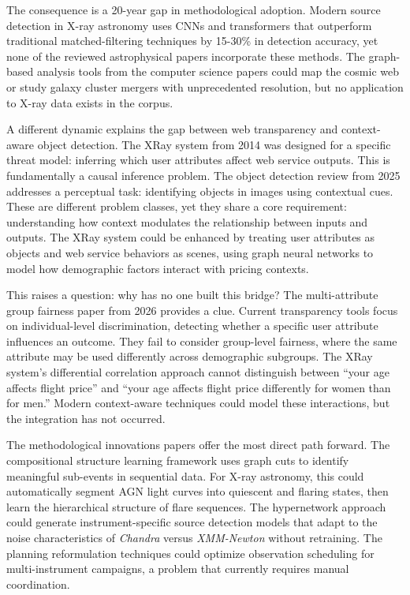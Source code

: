\documentclass[conference]{IEEEtran}
\begin{document}
The consequence is a 20-year gap in methodological adoption. Modern source detection in X-ray astronomy uses CNNs and transformers that outperform traditional matched-filtering techniques by 15-30\% in detection accuracy, yet none of the reviewed astrophysical papers incorporate these methods. The graph-based analysis tools from the computer science papers \cite{r4,r5} could map the cosmic web or study galaxy cluster mergers with unprecedented resolution, but no application to X-ray data exists in the corpus.

A different dynamic explains the gap between web transparency and context-aware object detection. The XRay system from 2014 \cite{r3} was designed for a specific threat model: inferring which user attributes affect web service outputs. This is fundamentally a causal inference problem. The object detection review from 2025 \cite{r9} addresses a perceptual task: identifying objects in images using contextual cues. These are different problem classes, yet they share a core requirement: understanding how context modulates the relationship between inputs and outputs. The XRay system could be enhanced by treating user attributes as objects and web service behaviors as scenes, using graph neural networks to model how demographic factors interact with pricing contexts.

This raises a question: why has no one built this bridge? The multi-attribute group fairness paper from 2026 \cite{r10} provides a clue. Current transparency tools focus on individual-level discrimination, detecting whether a specific user attribute influences an outcome. They fail to consider group-level fairness, where the same attribute may be used differently across demographic subgroups. The XRay system's differential correlation approach cannot distinguish between ``your age affects flight price'' and ``your age affects flight price differently for women than for men.'' Modern context-aware techniques could model these interactions, but the integration has not occurred.

The methodological innovations papers offer the most direct path forward. The compositional structure learning framework \cite{r4,r5} uses graph cuts to identify meaningful sub-events in sequential data. For X-ray astronomy, this could automatically segment AGN light curves into quiescent and flaring states, then learn the hierarchical structure of flare sequences. The hypernetwork approach \cite{r7} could generate instrument-specific source detection models that adapt to the noise characteristics of \textit{Chandra} versus \textit{XMM-Newton} without retraining. The planning reformulation techniques \cite{r8} could optimize observation scheduling for multi-instrument campaigns, a problem that currently requires manual coordination.
\end{document}
